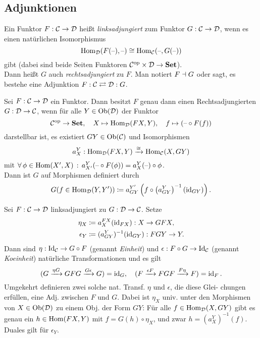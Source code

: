 \documentclass{cheat-sheet}
\begin{document}

\subsection{Adjunktionen}

\begin{defn}
  Ein Funktor $F : \mathcal{C} \to \mathcal{D}$ heißt \emph{linksadjungiert} zum Funktor $G : \mathcal{C} \to \mathcal{D}$, wenn es einen natürlichen Isomorphismus
  \[
    \operatorname{Hom}_{\mathcal{D}}(F(\text{--}), \text{--}) \cong \operatorname{Hom}_{\mathcal{C}}(\text{--}, G(\text{--}))
  \]
  gibt (dabei sind beide Seiten Funktoren $\mathcal{C}^{\mathrm{op}} \times \mathcal{D} \to \mathbf{Set}$). \\
  Dann heißt $G$ auch \emph{rechtsadjungiert} zu $F$. Man notiert $F \dashv G$ oder sagt, es bestehe eine Adjunktion \enspace $F : \mathcal{C} \rightleftarrows \mathcal{D} : G$.
\end{defn}

\begin{bem}
  Sei $F : \mathcal{C} \to \mathcal{D}$ ein Funktor.
  Dann besitzt $F$ genau dann einen Rechtsadjungierten $G : \mathcal{D} \to \mathcal{C}$, wenn für alle $Y \in \operatorname{Ob}(\mathcal{D})$ der Funktor
  \[
    \mathcal{C}^{\mathrm{op}} \to \mathbf{Set}, \quad
    X \mapsto \operatorname{Hom}_{\mathcal{D}}(FX, Y), \quad
    f \mapsto (\text{--} \circ F(f))
  \]
  darstellbar ist, \dh{} es existiert $GY \in \operatorname{Ob}(\mathcal{C})$ und Isomorphismen
  \[ a^Y_X : \operatorname{Hom}_{\mathcal{D}}(FX, Y) \xrightarrow{\cong} \operatorname{Hom}_{\mathcal{C}}(X, GY) \]
  mit $\forall \, {\phi \in \operatorname{Hom}(X', X)} \,:\, a^Y_{X'}(\text{--} \circ F(\phi)) = a^Y_X(\text{--}) \circ \phi$. \\
  Dann ist $G$ auf Morphismen definiert durch
  \[ G(f \in \operatorname{Hom}_{\mathcal{D}}(Y, Y')) \coloneqq a^{Y'}_{GY} \left( f \circ \left( a^Y_{GY} \right)^{-1} (\operatorname{id}_{GY}) \right). \]
\end{bem}

\begin{bem}
  Sei $F : \mathcal{C} \to \mathcal{D}$ linksadjungiert zu $G : \mathcal{D} \to \mathcal{C}$. Setze
  \begin{align*}
    \eta_X & \coloneqq a_X^{FX}(\operatorname{id}_{FX}) : X \to GFX, \\
    \epsilon_Y & \coloneqq (a_{GY}^Y)^{-1}(\operatorname{id}_{GY}) : FGY \to Y.
  \end{align*}
  Dann sind $\eta : \operatorname{Id}_{\mathcal{C}} \to G \circ F$ (genannt \emph{Einheit}) und $\epsilon : F \circ G \to \operatorname{Id}_{\mathcal{C}}$ (genannt \emph{Koeinheit}) natürliche Transformationen und es gilt
  \[
    (G \xrightarrow{\eta G} GFG \xrightarrow{G \epsilon} G) = \operatorname{id}_G, \quad
    (F \xrightarrow{\epsilon F} FGF \xrightarrow{F \eta} F) = \operatorname{id}_F.
  \]
  Umgekehrt definieren zwei solche nat. Transf. $\eta$ und $\epsilon$, die diese Glei- chungen erfüllen, eine Adj. zwischen $F$ und $G$.
  Dabei ist $\eta_X$ univ. unter den Morphismen von $X \in \operatorname{Ob}(\mathcal{D})$ zu einem Obj. der Form $GY$:
  Für alle $f \in \operatorname{Hom}_{\mathcal{D}}(X, GY)$ gibt es genau ein $h \in \operatorname{Hom}(FX, Y)$ mit $f = G(h) \circ \eta_X$, und zwar $h = (a_X^Y)^{-1}(f)$. Duales gilt für $\epsilon_Y$.
\end{bem}
\end{document}
